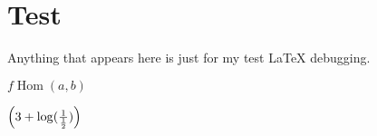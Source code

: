 \section{Test}
Anything that appears here is just for my test LaTeX debugging.

$f \operatorname{Hom}(a, b)$

$\qty(3 + \logarithm(\frac{1}{\frac{1}{2}}))$